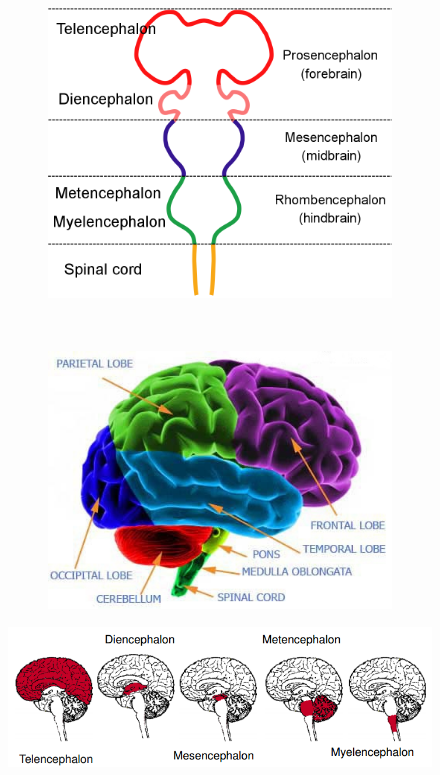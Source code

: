 \documentclass[a4paper, 12pt]{article}
\begin{document}
\begin{figure}[H]
	\centering
	\begin{subfigure}[b]{0.5\textwidth}
		\centering
		\includegraphics[width=\textwidth]{brain-parts.png}
	\end{subfigure}%
	~
	\begin{subfigure}[b]{0.5\textwidth}
		\centering
		\includegraphics[width=\textwidth]{brain.png}
	\end{subfigure}
\end{figure}
\begin{figure}[H]
	\centering
	\includegraphics[width=\textwidth]{brain_anatomy_01.png}
\end{figure}
\end{document}
